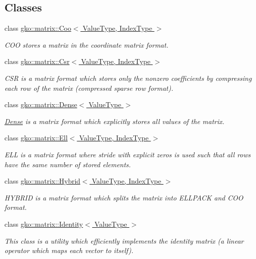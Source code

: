 \subsection*{Classes}
\begin{DoxyCompactItemize}
\item 
class \hyperlink{classgko_1_1matrix_1_1Coo}{gko\+::matrix\+::\+Coo$<$ Value\+Type, Index\+Type $>$}
\begin{DoxyCompactList}\small\item\em C\+OO stores a matrix in the coordinate matrix format. \end{DoxyCompactList}\item 
class \hyperlink{classgko_1_1matrix_1_1Csr}{gko\+::matrix\+::\+Csr$<$ Value\+Type, Index\+Type $>$}
\begin{DoxyCompactList}\small\item\em C\+SR is a matrix format which stores only the nonzero coefficients by compressing each row of the matrix (compressed sparse row format). \end{DoxyCompactList}\item 
class \hyperlink{classgko_1_1matrix_1_1Dense}{gko\+::matrix\+::\+Dense$<$ Value\+Type $>$}
\begin{DoxyCompactList}\small\item\em \hyperlink{classgko_1_1matrix_1_1Dense}{Dense} is a matrix format which explicitly stores all values of the matrix. \end{DoxyCompactList}\item 
class \hyperlink{classgko_1_1matrix_1_1Ell}{gko\+::matrix\+::\+Ell$<$ Value\+Type, Index\+Type $>$}
\begin{DoxyCompactList}\small\item\em E\+LL is a matrix format where stride with explicit zeros is used such that all rows have the same number of stored elements. \end{DoxyCompactList}\item 
class \hyperlink{classgko_1_1matrix_1_1Hybrid}{gko\+::matrix\+::\+Hybrid$<$ Value\+Type, Index\+Type $>$}
\begin{DoxyCompactList}\small\item\em H\+Y\+B\+R\+ID is a matrix format which splits the matrix into E\+L\+L\+P\+A\+CK and C\+OO format. \end{DoxyCompactList}\item 
class \hyperlink{classgko_1_1matrix_1_1Identity}{gko\+::matrix\+::\+Identity$<$ Value\+Type $>$}
\begin{DoxyCompactList}\small\item\em This class is a utility which efficiently implements the identity matrix (a linear operator which maps each vector to itself). \end{DoxyCompactList}\item 

\end{DoxyCompactItemize}
